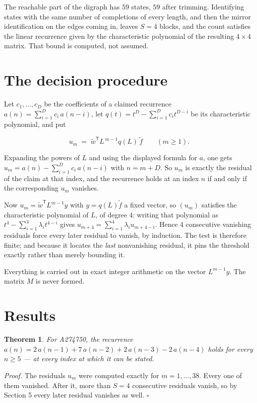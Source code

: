 \documentclass[11pt]{article}
\newtheorem{theorem}{Theorem}
\theoremstyle{definition}
\begin{document}
The reachable part of the digraph has $59$ states, $59$ after trimming. Identifying states with the same number of completions of every length, and then the mirror identification on the edges coming in, leaves $S = 4$ blocks, and the count satisfies the linear recurrence given by the characteristic polynomial of the resulting $4\times4$ matrix. That bound is computed, not assumed.

\section{The decision procedure}

Let $c_1,\dots,c_D$ be the coefficients of a claimed recurrence $a(n) = \sum_{i=1}^{D} c_i\,a(n-i)$, let $q(t) = t^{D} - \sum_{i=1}^{D} c_i t^{D-i}$ be its characteristic polynomial, and put

\[u_m \;=\; \tilde w^{\mathsf T} L^{\,m-1} q(L)\,\tilde f \qquad (m \ge 1).\]

Expanding the powers of $L$ and using the displayed formula for $a$, one gets $u_m = a(n) - \sum_{i=1}^{D} c_i\,a(n-i)$ with $n = m + D$. So $u_m$ is exactly the residual of the claim at that index, and the recurrence holds at an index $n$ if and only if the corresponding $u_m$ vanishes.

Now $u_m = \tilde w^{\mathsf T} L^{m-1} y$ with $y = q(L)\tilde f$ a fixed vector, so $(u_m)$ satisfies the characteristic polynomial of $L$, of degree $4$: writing that polynomial as $t^{4} - \sum_{i=1}^{4} \lambda_i t^{4-i}$ gives $u_{m+4} = \sum_{i=1}^{4} \lambda_i u_{m+4-i}$. Hence $4$ consecutive vanishing residuals force every later residual to vanish, by induction. The test is therefore finite; and because it locates the {\itshape last} nonvanishing residual, it pins the threshold exactly rather than merely bounding it.

Everything is carried out in exact integer arithmetic on the vector $L^{m-1}y$. The matrix $M$ is never formed.

\section{Results}

\begin{theorem} For A274750, the recurrence $a(n) = 2\,a(n-1) + 7\,a(n-2) + 2\,a(n-3) - 2\,a(n-4)$ holds for every $n \ge 5$ --- at every index at which it can be stated.\end{theorem}

{\itshape Proof.} The residuals $u_m$ were computed exactly for $m = 1,\dots,38$. Every one of them vanished. After it, more than $S = 4$ consecutive residuals vanish, so by Section 5 every later residual vanishes as well. $\square$
\end{document}
